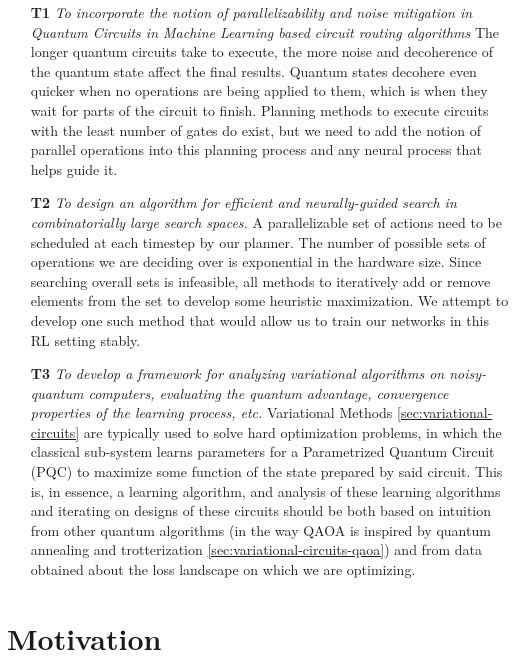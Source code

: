 \begin{enumerate}\label{enum:problems-addressed-by-thesis}
    \item[\textbf{T1}] \textit{To incorporate the notion of parallelizability and noise mitigation in Quantum Circuits in Machine Learning based circuit routing algorithms}
    The longer quantum circuits take to execute, the more noise and decoherence of the quantum state affect the final results. Quantum states decohere even quicker when no operations are being applied to them, which is when they wait for parts of the circuit to finish. Planning methods to execute circuits with the least number of gates do exist, but we need to add the notion of parallel operations into this planning process and any neural process that helps guide it.

    \item[\textbf{T2}] \textit{To design an algorithm for efficient and neurally-guided search in combinatorially large search spaces.}
    A parallelizable set of actions need to be scheduled at each timestep by our planner. The number of possible sets of operations we are deciding over is exponential in the hardware size. Since searching overall sets is infeasible, all methods to iteratively add or remove elements from the set to develop some heuristic maximization. We attempt to develop one such method that would allow us to train our networks in this RL setting stably.

    \item[\textbf{T3}] \textit{To develop a framework for analyzing variational algorithms on noisy-quantum computers, evaluating the quantum advantage, convergence properties of the learning process, etc.}
    Variational Methods \ref{sec:variational-circuits} are typically used to solve hard optimization problems, in which the classical sub-system learns parameters for a Parametrized Quantum Circuit (PQC) to maximize some function of the state prepared by said circuit. This is, in essence, a learning algorithm, and analysis of these learning algorithms and iterating on designs of these circuits should be both based on intuition from other quantum algorithms (in the way QAOA is inspired by quantum annealing and trotterization \ref{sec:variational-circuits-qaoa}) and from data obtained about the loss landscape on which we are optimizing.
\end{enumerate}

\section{Motivation}

